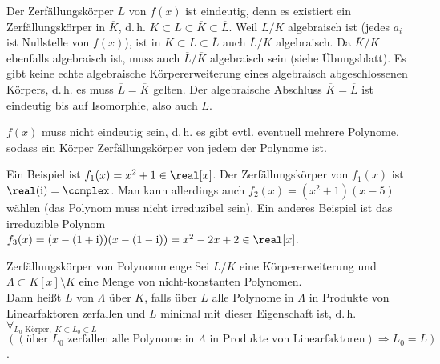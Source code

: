 \begin{Bem}
    Der Zerfällungskörper $L$ von $f(x)$ ist eindeutig, denn es existiert
    ein Zerfällungskörper in $\overline{K}$, d.\,h.
    $K \subset L \subset \overline{K} \subset \overline{L}$.
    Weil $L/K$ algebraisch ist (jedes $a_i$ ist Nullstelle von $f(x)$), ist
    in $K \subset L \subset \overline{L}$ auch $\overline{L}/K$ algebraisch.
    Da $\overline{K}/K$ ebenfalls algebraisch ist, muss auch
    $\overline{L}/\overline{K}$ algebraisch sein (siehe Übungsblatt).
    Es gibt keine echte algebraische Körpererweiterung eines algebraisch
    abgeschlossenen Körpers, d.\,h.
    es muss $\overline{L} = \overline{K}$ gelten.
    Der algebraische Abschluss $\overline{K} = \overline{L}$ ist eindeutig bis
    auf Isomorphie, also auch $L$.
\end{Bem}

\begin{Bem}
    $f(x)$ muss nicht eindeutig sein, d.\,h. es gibt evtl. eventuell
    mehrere Polynome, sodass ein Körper Zerfällungskörper von jedem der
    Polynome ist.
\end{Bem}

\begin{Bsp}
    Ein Beispiel ist $f_1(x) = x^2 + 1 \in \real[x]$.
    Der Zerfällungskörper von $f_1(x)$ ist $\real(\i) = \complex$.
    Man kann allerdings auch $f_2(x) = (x^2 + 1)(x - 5)$ wählen
    (das Polynom muss nicht irreduzibel sein).
    Ein anderes Beispiel ist das irreduzible Polynom\\
    $f_3(x) = (x - (1 + \i)) (x - (1 - \i)) = x^2 - 2x + 2 \in \real[x]$.
\end{Bsp}

\linie

\begin{Def}{Zerfällungskörper von Polynommenge}
    Sei $L/K$ eine Körpererweiterung und\\
    $\Lambda \subset K[x] \setminus K$ eine Menge von
    nicht-konstanten Polynomen.\\
    Dann heißt $L$  von $\Lambda$ über $K$, falls
    über $L$ alle Polynome in $\Lambda$ in Produkte von Linearfaktoren
    zerfallen und $L$ minimal mit dieser Eigenschaft ist,
    d.\,h. $\forall_{L_0 \text{ Körper},\; K \subset L_0 \subset L}$\\
    $((\text{über } L_0 \text{ zerfallen alle Polynome in } \Lambda
    \text{ in Produkte von Linearfaktoren}) \Rightarrow L_0 = L)$.
\end{Def}

